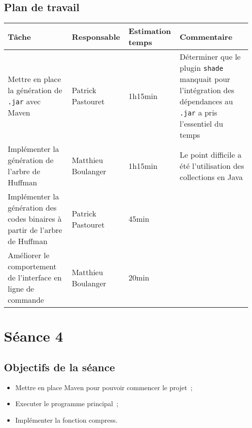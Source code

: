 \documentclass[a4paper,11pt]{article}
\begin{document}
\subsection{Plan de travail}
\begin{center}
    \begin{tabular}{p{.3\linewidth}p{.3\linewidth}p{.3\linewidth}p{.3\linewidth}}
      \toprule
	Tâche & Responsable & Estimation temps & Commentaire \\
      \midrule
      Mettre en place la génération de \texttt{.jar} avec Maven & 
      Patrick Pastouret & 
      1h15min & 
      Déterminer que le plugin \texttt{shade} manquait pour l’intégration des dépendances au \texttt{.jar} a pris l’essentiel du temps \\
      Implémenter la génération de l’arbre de Huffman &
      Matthieu Boulanger &
      1h15min &
      Le point difficile a été l’utilisation des collections en Java \\
      Implémenter la génération des codes binaires à partir de l’arbre de Huffman &
      Patrick Pastouret &
      45min &
      \\
      Améliorer le comportement de l’interface en ligne de commande & 
      Matthieu Boulanger & 
      20min & 
      \\
      \bottomrule
   \end{tabular}
\end{center}

\section{Séance 4}

\subsection{Objectifs de la séance}
\begin{itemize}
    \item Mettre en place Maven pour pouvoir commencer le projet~;
    \item Executer le programme principal~;
    \item Implémenter la fonction compress.
\end{itemize}
\end{document}
